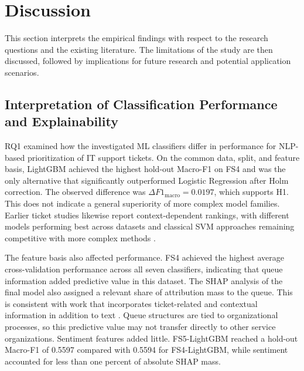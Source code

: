 \section{Discussion}

This section interprets the empirical findings with respect to the research
questions and the existing literature. The limitations of the study are then
discussed, followed by implications for future research and potential
application scenarios.

\subsection{Interpretation of Classification Performance and Explainability}

RQ1 examined how the investigated ML classifiers differ in performance for
NLP-based prioritization of IT support tickets. On the common data, split, and
feature basis, LightGBM achieved the highest hold-out Macro-F1 on FS4 and was
the only alternative that significantly outperformed Logistic Regression after
Holm correction. The observed difference was
$\Delta F1_{\mathrm{macro}} = 0.0197$, which supports H1. This does not
indicate a general superiority of more complex model families. Earlier ticket
studies likewise report context-dependent rankings, with different models
performing best across datasets and classical SVM approaches remaining
competitive with more complex methods
\cite{ahmed2023incident,martins2024port,bonechi2024support}.

The feature basis also affected performance. FS4 achieved the highest average
cross-validation performance across all seven classifiers, indicating that
queue information added predictive value in this dataset. The SHAP analysis
of the final model also assigned a relevant share of attribution mass to the
queue. This is consistent with work that incorporates ticket-related and
contextual information in addition to text
\cite{beckers2009multifacet,fuchs2022support}. Queue structures are tied to
organizational processes, so this predictive value may not transfer directly
to other service organizations. Sentiment features added little.
FS5-LightGBM reached a hold-out Macro-F1 of 0.5597 compared with 0.5594 for
FS4-LightGBM, while sentiment accounted for less than one percent of absolute
SHAP mass.

